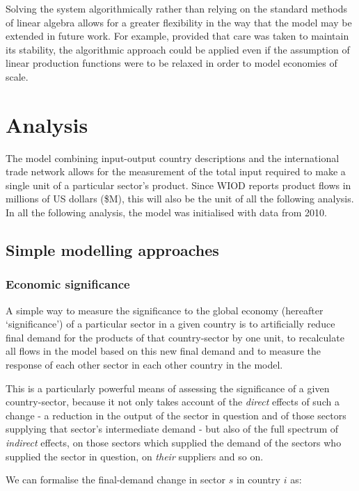\documentclass[a4paper]{article}
\begin{document}
Solving the system algorithmically rather than relying on the standard methods of linear algebra allows for a greater flexibility in the way that the model may be extended in future work. For example, provided that care was taken to maintain its stability, the algorithmic approach could be applied even if the assumption of linear production functions were to be relaxed in order to model economies of scale.


\section{Analysis}\label{sec:analysis}
The model combining input-output country descriptions and the international trade network allows for the measurement of the total input required to make a single unit of a particular sector's product.
Since WIOD reports product flows in millions of US dollars (\$M), this will also be the unit of all the following analysis.
In all the following analysis, the model was initialised with data from 2010.

\subsection{Simple modelling approaches}
\label{sec:simple_modelling_approaches}

\subsubsection*{Economic significance}
A simple way to measure the significance to the global economy (hereafter `significance') of a particular sector in a given country is to artificially reduce final demand for the products of that country-sector by one unit, to recalculate all flows in the model based on this new final demand and to measure the response of each other sector in each other country in the model.

This is a particularly powerful means of assessing the significance of a given country-sector, because it not only takes account of the \textit{direct} effects of such a change - a reduction in the output of the sector in question and of those sectors supplying that sector's intermediate demand - but also of the full spectrum of \textit{indirect} effects, on those sectors which supplied the demand of the sectors who supplied the sector in question, on \textit{their} suppliers and so on.

We can formalise the final-demand change in sector $s$ in country $i$ as:
\end{document}
